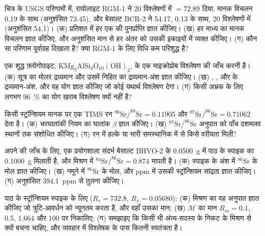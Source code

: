 \begin{exercise}[$\star\star$]\label{exo:b2:field-lab-methods-2:6}
चित्र के USGS परिणामों में, रायोलाइट RGM-1 ने 20 विश्लेषणों में  $= 72.89$ दिया, मानक
विचलन 0.19 के साथ (अनुशंसित 73.45), और बेसाल्ट BCR-2 ने 54.17, 0.13 के साथ, 20
विश्लेषणों में (अनुशंसित 54.1)। (क) प्रतिशत में हर एक की पुनर्प्राप्ति ज्ञात कीजिए। (ख) हर माध्य का मानक
विचलन ज्ञात कीजिए, और अनुशंसित मान से हर अंतर को उसकी इकाइयों में व्यक्त कीजिए।
(ग) कौन सा परिणाम पूर्वाग्रह दिखाता है? क्या RGM-1 के लिए विधि कम परिशुद्ध है?
\end{exercise}

\begin{exercise}[$\star\star$]\label{exo:b2:field-lab-methods-2:7}
एक शुद्ध फ़्लोगोपाइट, $\mathrm{KMg_3AlSi_3O_{10}(OH)_2}$, के एक माइक्रोप्रोब विश्लेषण की जाँच करनी है।
(क) सूत्र का मोलर द्रव्यमान और उसमें निहित  का द्रव्यमान-अंश ज्ञात कीजिए। (ख)
, ,  और  के द्रव्यमान-अंश, और वह योग ज्ञात कीजिए जो कोई यथार्थ विश्लेषण
देगा। (ग) किसी अभ्रक के लिए लगभग \qty{96}{\percent} का योग खराब विश्लेषण क्यों नहीं है?
\end{exercise}

\begin{exercise}[$\star\star$]\label{exo:b2:field-lab-methods-2:8}
किसी स्ट्रॉन्शियम मानक पर एक TIMS रन $^{86}\mathrm{Sr}/^{88}\mathrm{Sr} = 0.11905$ और
$^{87}\mathrm{Sr}/^{86}\mathrm{Sr} = 0.71062$ देता है। (क) चरघातांकी नियम का घातांक $\beta$ ज्ञात कीजिए।
(ख) $^{87}\mathrm{Sr}/^{86}\mathrm{Sr}$ अनुपात को पाँच दशमलव स्थानों तक संशोधित कीजिए। (ग) रन में हल्के
या भारी समस्थानिक में से किसे वरीयता मिली?
\end{exercise}

\begin{exercise}[$\star\star$]\label{exo:b2:field-lab-methods-2:9}
अपने  की जाँच के लिए, एक प्रयोगशाला संदर्भ बेसाल्ट BHVO-2 के \qty{0.0500}{g} में
पाठ के स्पाइक का \qty{0.1000}{g} मिलाती है, और मिश्रण में $^{84}\mathrm{Sr}/^{86}\mathrm{Sr} =
0.874$ मापती है। (क) स्पाइक के अंश में $^{86}\mathrm{Sr}$ के मोल ज्ञात कीजिए। (ख) नमूने में
$^{86}\mathrm{Sr}$ के मोल, और ppm में उसकी स्ट्रॉन्शियम सांद्रता ज्ञात कीजिए। (ग) अनुशंसित
\qty{394.1}{ppm} से तुलना कीजिए।
\end{exercise}

\begin{exercise}[$\star\star\star$]\label{exo:b2:field-lab-methods-2:10}
पाठ के स्ट्रॉन्शियम स्पाइक के लिए ($R_s = 732.8$, $R_x = 0.05680$): (क) मिश्रण का वह अनुपात ज्ञात कीजिए
जो त्रुटि-आवर्धन को न्यूनतम करता है, और वहाँ उसका मान; (ख) $\mathcal M$ का मान
$R_m = 0.1$, 0.5, 1.664 और 100 पर निकालिए; (ग) समझाइए कि किसी भी अंत्य-सदस्य के निकट के मिश्रण से क्यों
बचना चाहिए, और व्यवहार में विश्लेषक के पास कितनी स्वतंत्रता है।
\end{exercise}

